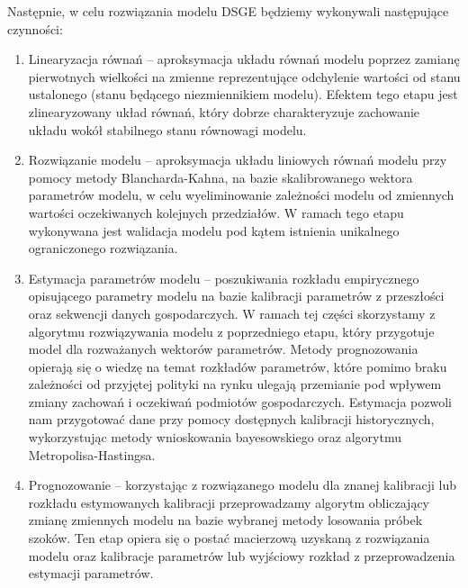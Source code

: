 Następnie, w celu rozwiązania modelu DSGE będziemy wykonywali następujące czynności:
\begin{enumerate}
    \item Linearyzacja równań -- aproksymacja układu równań modelu poprzez zamianę pierwotnych wielkości na zmienne reprezentujące odchylenie wartości od stanu ustalonego (stanu będącego niezmiennikiem modelu). Efektem tego etapu jest zlinearyzowany układ równań, który dobrze charakteryzuje zachowanie układu wokół stabilnego stanu równowagi modelu.
    \item Rozwiązanie modelu -- aproksymacja układu liniowych równań modelu przy pomocy metody Blancharda-Kahna, na bazie skalibrowanego wektora parametrów modelu, w celu wyeliminowanie zależności modelu od zmiennych wartości oczekiwanych kolejnych przedziałów. W ramach tego etapu wykonywana jest walidacja modelu pod kątem istnienia unikalnego ograniczonego rozwiązania.
    \item Estymacja parametrów modelu -- poszukiwania rozkładu empirycznego opisującego parametry modelu na bazie kalibracji parametrów z przeszłości oraz sekwencji danych gospodarczych. W ramach tej części skorzystamy z algorytmu rozwiązywania modelu z poprzedniego etapu, który przygotuje model dla rozważanych wektorów parametrów. Metody prognozowania opierają się o wiedzę na temat rozkładów parametrów, które pomimo braku zależności od przyjętej polityki na rynku ulegają przemianie pod wpływem zmiany zachowań i oczekiwań podmiotów gospodarczych. Estymacja pozwoli nam przygotować dane przy pomocy dostępnych kalibracji historycznych, wykorzystując metody wnioskowania bayesowskiego oraz algorytmu Metropolisa-Hastingsa.
    \item Prognozowanie -- korzystając z rozwiązanego modelu dla znanej kalibracji lub rozkładu estymowanych kalibracji przeprowadzamy algorytm obliczający zmianę zmiennych modelu na bazie wybranej metody losowania próbek szoków. Ten etap opiera się o postać macierzową uzyskaną z rozwiązania modelu oraz kalibracje parametrów lub wyjściowy rozkład z przeprowadzenia estymacji parametrów.
    
    
    
\end{enumerate}

